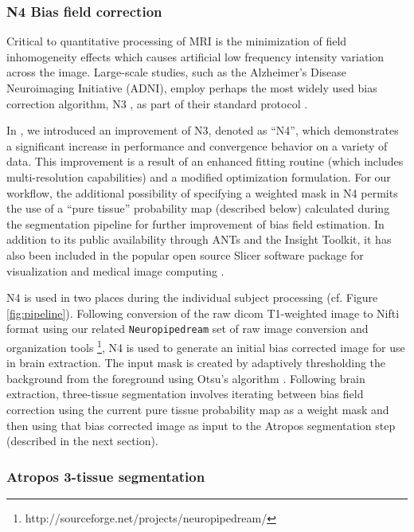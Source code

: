 \subsubsection{N4 Bias field correction}

Critical to quantitative processing of MRI is the minimization of
field inhomogeneity effects which causes artificial low frequency 
intensity variation across the image.  Large-scale studies, such
as the Alzheimer's Disease Neuroimaging Initiative (ADNI), employ
perhaps the most widely used bias correction algorithm, N3 \cite{sled1998}, 
as part of their standard protocol \citep{boyes2008}.

In \cite{Tustison2010}, we introduced an improvement of N3, denoted as
``N4'', which demonstrates a significant increase in performance and convergence behavior
on a variety of data.  This improvement is a result of an enhanced 
fitting routine (which includes multi-resolution capabilities) and a modified optimization 
formulation.  For our workflow, the additional possibility of specifying
a weighted mask in N4 permits the use of a ``pure tissue'' probability map 
(described below)
calculated during the segmentation pipeline for further improvement of 
bias field estimation.  In addition to its public availability 
through ANTs and the Insight Toolkit, it has also been included in
the popular open source Slicer software package for visualization and medical
image computing \cite{fedorov2011}.

N4 is used in two places during the individual subject processing (cf. Figure
\ref{fig:pipeline}).  Following conversion of the raw dicom T1-weighted image
to Nifti format using our related \verb#Neuropipedream# set of raw image conversion
and organization tools%
\footnote{
http://sourceforge.net/projects/neuropipedream/
}, N4 is used to generate an initial bias corrected image for use in
brain extraction.  The input mask is created by adaptively thresholding 
the background from the foreground using Otsu's algorithm \cite{otsu1979}.
Following brain extraction, three-tissue segmentation involves iterating
between bias field correction using the current pure tissue 
probability map as a weight mask and then using that bias corrected image
as input to the Atropos segmentation step (described in the next section). 

\subsubsection{Atropos 3-tissue segmentation}

